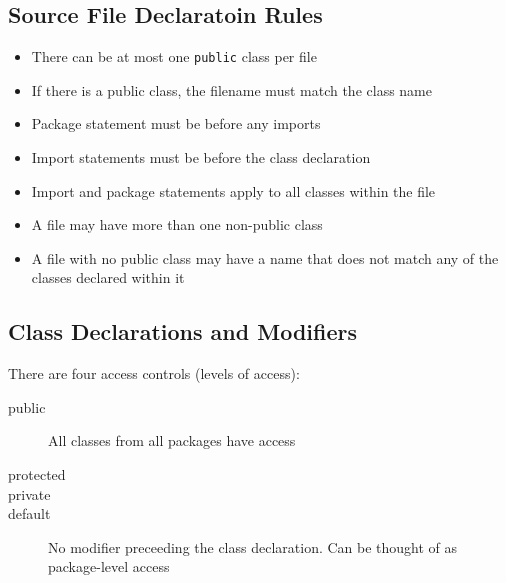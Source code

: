 \subsection{Source File Declaratoin Rules}
\begin{itemize}
    \item There can be at most one \verb#public# class per file
    \item If there is a public class, the filename must match the class name
    \item Package statement must be before any imports
    \item Import statements must be before the class declaration
    \item Import and package statements apply to all classes within the file
    \item A file may have more than one non-public class
    \item A file with no public class may have a name that does not match any 
    of the classes declared within it
\end{itemize}

\subsection{Class Declarations and Modifiers}
There are four access controls (levels of access):
\begin{description}
    \item[public] All classes from all packages have access
    \item[protected]
    \item[private]
    \item[default] No modifier preceeding the class declaration. Can be thought 
    of as package-level access
\end{description}

